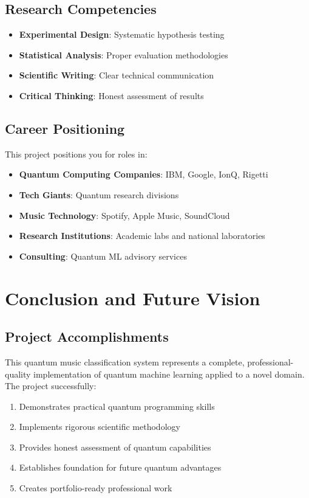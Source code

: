 \documentclass[11pt,a4paper]{article}
\begin{document}
\subsection{Research Competencies}

\begin{itemize}
    \item \textbf{Experimental Design}: Systematic hypothesis testing
    \item \textbf{Statistical Analysis}: Proper evaluation methodologies
    \item \textbf{Scientific Writing}: Clear technical communication
    \item \textbf{Critical Thinking}: Honest assessment of results
\end{itemize}

\subsection{Career Positioning}

This project positions you for roles in:

\begin{itemize}
    \item \textbf{Quantum Computing Companies}: IBM, Google, IonQ, Rigetti
    \item \textbf{Tech Giants}: Quantum research divisions
    \item \textbf{Music Technology}: Spotify, Apple Music, SoundCloud
    \item \textbf{Research Institutions}: Academic labs and national laboratories
    \item \textbf{Consulting}: Quantum ML advisory services
\end{itemize}

\section{Conclusion and Future Vision}

\subsection{Project Accomplishments}

This quantum music classification system represents a complete, professional-quality implementation of quantum machine learning applied to a novel domain. The project successfully:

\begin{enumerate}
    \item Demonstrates practical quantum programming skills
    \item Implements rigorous scientific methodology
    \item Provides honest assessment of quantum capabilities
    \item Establishes foundation for future quantum advantages
    \item Creates portfolio-ready professional work
\end{enumerate}
\end{document}
